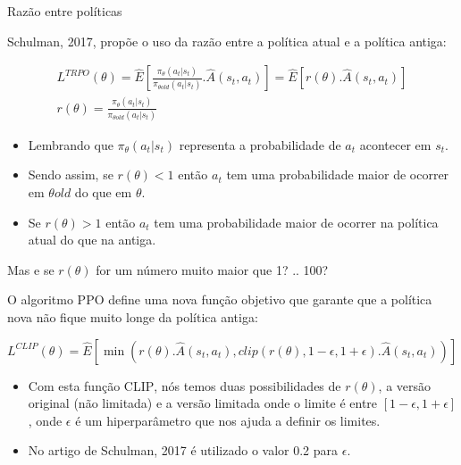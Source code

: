 \documentclass{beamer}
\begin{document}
\begin{frame}{Razão entre políticas}
	
	Schulman, 2017, propõe o uso da razão entre a política atual e a política antiga: 
	
	\begin{eqnarray}
	L^{TRPO}(\theta) = \hat{E} \left[\frac{\pi_{\theta}(a_{t}|s_{t})}{\pi_{\theta old}(a_{t}|s_{t})}.\hat{A}(s_{t},a_{t}) \right] = \hat{E}  \left[ r(\theta). \hat{A}(s_{t},a_{t}) \right] \\	
	r(\theta) = \frac{\pi_{\theta}(a_{t}|s_{t})}{\pi_{\theta old}(a_{t}|s_{t})} 
	\end{eqnarray}


\begin{itemize}
	\item Lembrando que $\pi_{\theta}(a_{t}|s_{t})$ representa a probabilidade de $a_{t}$ acontecer em $s_{t}$.
	\item Sendo assim, se $r(\theta) < 1$ então $a_{t}$ tem uma probabilidade maior de ocorrer em $\theta old$ do que em $\theta$.
	\item Se $r(\theta) > 1$ então $a_{t}$ tem uma probabilidade maior de ocorrer na política atual do que na antiga. 
\end{itemize}

\end{frame}


\begin{frame}{Mas e se $r(\theta)$ for um número muito maior que 1? .. 100?}
	
O algoritmo PPO define uma nova função objetivo que garante que a política nova não fique muito longe da política antiga:
	
	\begin{equation}
	L^{CLIP}(\theta) = \hat{E} \left[ \min \left(r(\theta).\hat{A}(s_{t},a_{t}) , clip(r(\theta), 1 - \epsilon, 1 + \epsilon).\hat{A}(s_{t},a_{t}) \right) \right]		
	\end{equation}

\begin{itemize}
	\item Com esta função \textsc{CLIP}, nós temos duas possibilidades de $r(\theta)$, a versão original (não limitada) e a versão limitada onde o limite é entre $\left[ 1 - \epsilon, 1 + \epsilon \right]$, onde $\epsilon$ é um hiperparâmetro que nos ajuda a definir os limites. 
	\item No artigo de Schulman, 2017 é utilizado o valor 0.2 para $\epsilon$.
\end{itemize}
	
\end{frame}
\end{document}
